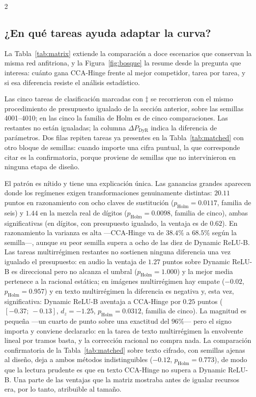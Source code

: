 \begin{multicols}{2}
\subsection{¿En qué tareas ayuda adaptar la curva?}

La Tabla~\ref{tab:matrix} extiende la comparación a doce escenarios que conservan la misma red anfitriona, y la Figura~\ref{fig:bosque} la resume desde la pregunta que interesa: cuánto gana CCA-Hinge frente al mejor competidor, tarea por tarea, y si esa diferencia resiste el análisis estadístico.

Las cinco tareas de clasificación marcadas con $\ddagger$ se recorrieron con el mismo procedimiento de presupuesto igualado de la sección anterior, sobre las semillas 4001--4010; en las cinco la familia de Holm es de cinco comparaciones. Las restantes no están igualadas; la columna $\Delta P_{\mathrm{DyR}}$ indica la diferencia de parámetros. Dos filas repiten tareas ya presentes en la Tabla~\ref{tab:matched} con otro bloque de semillas: cuando importe una cifra puntual, la que corresponde citar es la confirmatoria, porque proviene de semillas que no intervinieron en ninguna etapa de diseño.

El patrón es nítido y tiene una explicación única. Las ganancias grandes aparecen donde los regímenes exigen transformaciones genuinamente distintas: $20.11$ puntos en razonamiento con ocho claves de sustitución ($p_{\mathrm{Holm}}=0.0117$, familia de seis) y $1.44$ en la mezcla real de dígitos ($p_{\mathrm{Holm}}=0.0098$, familia de cinco), ambas significativas (en dígitos, con presupuesto igualado, la ventaja es de $0.62$). En razonamiento la varianza es alta —CCA-Hinge va de $38.4\%$ a $68.5\%$ según la semilla—, aunque su peor semilla supera a ocho de las diez de Dynamic ReLU-B. Las tareas multirrégimen restantes no sostienen ninguna diferencia una vez igualado el presupuesto: en audio la ventaja de $1.27$ puntos sobre Dynamic ReLU-B es direccional pero no alcanza el umbral ($p_{\mathrm{Holm}}=1.000$) y la mejor media pertenece a la racional estática; en imágenes multirrégimen hay empate ($-0.02$, $p_{\mathrm{Holm}}=0.957$) y en texto multirrégimen la diferencia es negativa y, esta vez, significativa: Dynamic ReLU-B aventaja a CCA-Hinge por $0.25$ puntos ($[-0.37;\ -0.13]$, $d_z=-1.25$, $p_{\mathrm{Holm}}=0.0312$, familia de cinco). La magnitud es pequeña —un cuarto de punto sobre una exactitud del $96\%$— pero el signo importa y conviene declararlo: en la tarea de texto multirrégimen la envolvente lineal por tramos basta, y la corrección racional no compra nada. La comparación confirmatoria de la Tabla~\ref{tab:matched} sobre texto cifrado, con semillas ajenas al diseño, deja a ambos métodos indistinguibles ($-0.12$, $p_{\mathrm{Holm}}=0.773$), de modo que la lectura prudente es que en texto CCA-Hinge no supera a Dynamic ReLU-B. Una parte de las ventajas que la matriz mostraba antes de igualar recursos era, por lo tanto, atribuible al tamaño.


\end{multicols}
